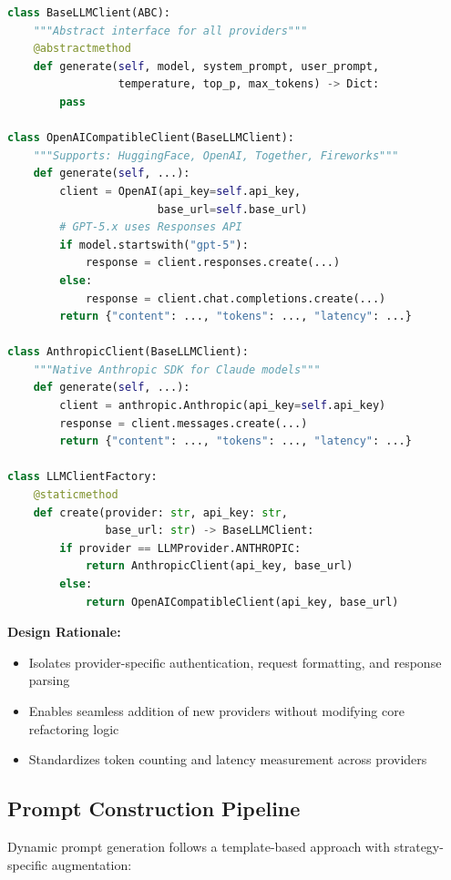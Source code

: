 \begin{lstlisting}[language=Python, caption=LLM Client Factory Pattern]
class BaseLLMClient(ABC):
    """Abstract interface for all providers"""
    @abstractmethod
    def generate(self, model, system_prompt, user_prompt,
                 temperature, top_p, max_tokens) -> Dict:
        pass

class OpenAICompatibleClient(BaseLLMClient):
    """Supports: HuggingFace, OpenAI, Together, Fireworks"""
    def generate(self, ...):
        client = OpenAI(api_key=self.api_key, 
                       base_url=self.base_url)
        # GPT-5.x uses Responses API
        if model.startswith("gpt-5"):
            response = client.responses.create(...)
        else:
            response = client.chat.completions.create(...)
        return {"content": ..., "tokens": ..., "latency": ...}

class AnthropicClient(BaseLLMClient):
    """Native Anthropic SDK for Claude models"""
    def generate(self, ...):
        client = anthropic.Anthropic(api_key=self.api_key)
        response = client.messages.create(...)
        return {"content": ..., "tokens": ..., "latency": ...}

class LLMClientFactory:
    @staticmethod
    def create(provider: str, api_key: str, 
               base_url: str) -> BaseLLMClient:
        if provider == LLMProvider.ANTHROPIC:
            return AnthropicClient(api_key, base_url)
        else:
            return OpenAICompatibleClient(api_key, base_url)
\end{lstlisting}

\textbf{Design Rationale:}
\begin{itemize}
    \item Isolates provider-specific authentication, request formatting, and response parsing
    \item Enables seamless addition of new providers without modifying core refactoring logic
    \item Standardizes token counting and latency measurement across providers
\end{itemize}

\subsection{Prompt Construction Pipeline}

Dynamic prompt generation follows a template-based approach with strategy-specific augmentation:

